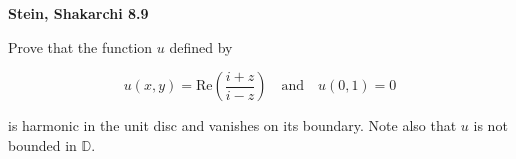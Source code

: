 \textbf{Stein, Shakarchi 8.9}

Prove that the function $u$ defined by

$$
u(x, y) = \text{Re} \left( \frac{i + z}{i - z} \right) \quad \text{and} \quad u(0, 1) = 0
$$

is harmonic in the unit disc and vanishes on its boundary. Note also that $u$ is not bounded in $\mathbb{D}$.

\begin{solution}
  \ \\
\end{solution}
